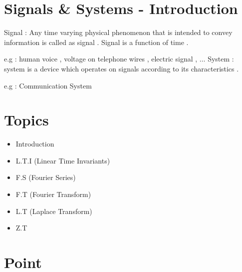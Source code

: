 \documentclass[12pt]{article}
\begin{document}
\section{Signals \& Systems - Introduction}

Signal : Any time varying physical phenomenon that is intended to convey information is called as signal .
\newline \newline
\noindent
Signal is a function of time .


\noindent
e.g : human voice , voltage on telephone wires , electric signal , $\dots$
\newline \newline
\noindent
System : system is a device which operates on signals according to its characteristics .


\begin{center}
\end{center}


\noindent
e.g : Communication System



\section{Topics}


\begin{itemize}
	\item Introduction
	\item L.T.I (Linear Time Invariants)
	\item F.S (Fourier Series)
	\item F.T (Fourier Transform)
	\item L.T (Laplace Transform)
	\item Z.T 
\end{itemize}




\section{Point}
\end{document}

